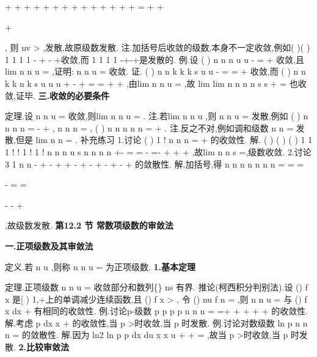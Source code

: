 +
+
+
+
+
+
+
+
+
+
+
+
+
+
=
+
+







+







\Lambda 
\Lambda 
\Lambda 
\Lambda 
\Lambda 
\Lambda , 
则
nv >
,发散,故原级数发散. 
\textcolor{lyred}{注}.加括号后收敛的级数,本身不一定收敛,例如(
)(
)
1 1
1 1
-
+
-
+\Lambda 收敛,而 
1 1 1 1
-+-+\Lambda 是发散的. 
\textcolor{lyred}{例}.设
(
)
n
n
n
u
u
\infty 
-
=
+
\sum 
收敛,且lim
n
n
u
\to \infty 
=
,证明:
n
n
u
\infty 
=\sum 
收敛. 
证.
(
)
n
n
k
k
k
s
u
u
-
=
=
+
\sum 
收敛,而
(
)
n
n
k
k
n
k
s
u
u
u
+
-
+
=
=
+
+
\sum 
,由lim
n
n
u
\to \infty 
=
,故 
lim
lim
n
n
n
n
s
s
+
\to \infty 
\to \infty 
=
也收敛,证毕. 
\vspace{4pt}
{\bfseries \textcolor{lyred}{三.收敛的必要条件}}

\textcolor{lyred}{定理}.设
n
n
u
\infty 
=\sum 
收敛,则lim
n
n
u
\to \infty 
=
. 
\textcolor{lyred}{注}.若lim
n
n
u
\to \infty 
\neq 
,则
n
n
u
\infty 
=\sum 
发散,例如
(
)
n
n
n
n
\infty 
=
-
+
\sum 
,
n
n
n
\infty 
=\sum 
,
(
)
n
n
n
n
n
\infty 
=
+
\sum 
. 
\textcolor{lyred}{注}.反之不对,例如\textcolor{lyred}{调和级数}
n
n
\infty 
=\sum 
发散,但是
lim
n
n
\to \infty 
=
. 
\textcolor{lyred}{补充练习 }
1.讨论
(
)
1 !
n
n
n
\infty 
=
+
\sum 
的收敛性. 
解.
(
)
(
)
(
)
1 1
1 !
!
1 !
1 !
n
n
n
u
s
n
n
n
n
+-
=
=
-
\Rightarrow 
=-
+
+
+
,故lim
n
n
s
\to \infty 
=,级数收敛. 
2.讨论
3 1
n
n
-
+
-
+
+
-
+
-
+
-
+
-
+
\Lambda 
\Lambda 的敛散性. 
解.加括号,得
n
n
n
n
n
n
n
\infty 
\infty 
\infty 
=
=
=


-
=
=


-
-
+


\sum 
\sum 
\sum 
,故级数发散. 
\vspace{6pt}
{\large \bfseries \textcolor{lyred}{第12.2 节 常数项级数的审敛法}}

\vspace{4pt}
{\bfseries \textcolor{lyred}{一.正项级数及其审敛法}}

\textcolor{lyred}{定义}.若
n
u \ge 
,则称
n
n
u
\infty 
=\sum 
为\textcolor{lyred}{正项级数}. 
{\bfseries \textcolor{lyred}{1.基本定理}}

\textcolor{lyred}{定理}.正项级数
n
n
u
\infty 
=\sum 
收敛\Leftrightarrow 部分和数列\{\}
ns
有界. 
\textcolor{lyred}{推论(柯西积分判别法)}.设
()
f x 是[
)
1,+\infty 上的单调减少连续函数,且
()
f x >
, 
令
()
nu
f n
=
,则
n
n
u
\infty 
=\sum 
与
()
f x dx
+\infty 
\int 
有相同的收敛性. 
\textcolor{lyred}{例}.讨论\textcolor{lyred}{p-级数}
p
p
p
p
n
n
n
\infty 
=
=+
+
+
+
+
\sum 
\Lambda 
\Lambda 的收敛性. 
解.考虑
p dx
x
+\infty 
\int 
的收敛性,当
p >时收敛,当
p \le 时发散. 
\textcolor{lyred}{例}.讨论\textcolor{lyred}{对数级数}
ln p
n
n
n
\infty 
=\sum 
的敛散性. 
解.因为
ln2
ln p
p
dx
du
x
x
u
+\infty 
+\infty 
=
\int 
\int 
,故当
p >时收敛,当
p \le 时发散. 
{\bfseries \textcolor{lyred}{2.比较审敛法}}

